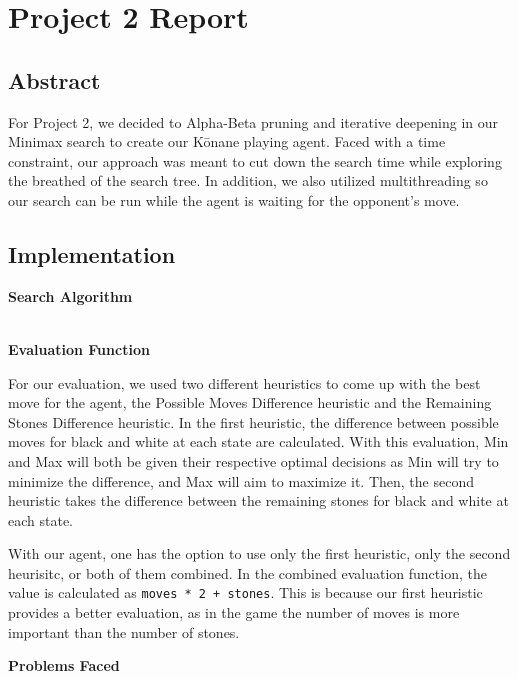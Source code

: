 \documentclass[12pt]{article}
\begin{document}
\section*{Project 2 Report}

\subsection*{Abstract}
For Project 2, we decided to Alpha-Beta pruning and iterative deepening in our Minimax search to create our Kōnane playing agent. Faced with a time constraint, our approach was meant to cut down the search time while exploring the breathed of the search tree. In addition, we also utilized multithreading so our search can be run while the agent is waiting for the opponent’s move.

\subsection*{Implementation}

\textbf{Search Algorithm} \par
\\
\textbf{Evaluation Function} \par
For our evaluation, we used two different heuristics to come up with the best move for the agent, the Possible Moves Difference heuristic and the Remaining Stones Difference heuristic. In the first heuristic, the difference between possible moves for black and white at each state are calculated. With this evaluation, Min and Max will both be given their respective optimal decisions as Min will try to minimize the difference, and Max will aim to maximize it. Then, the second heuristic takes the difference between the remaining stones for black and white at each state. \par
With our agent, one has the option to use only the first heuristic, only the second heurisitc, or both of them combined. In the combined evaluation function, the value is calculated as \texttt{moves * 2 + stones}. This is because our first heuristic provides a better evaluation, as in the game the number of moves is more important than the number of stones.


\textbf{Problems Faced} \\
\end{document}
